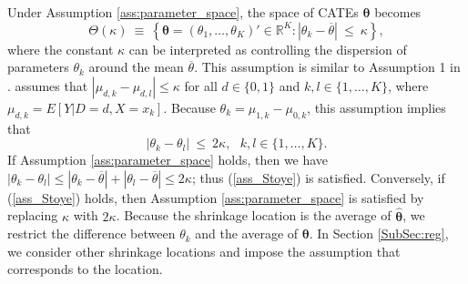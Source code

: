 \documentclass[12pt,a4paper]{article}
\begin{document}
Under Assumption \ref{ass:parameter_space}, the space of CATEs $\bm{\theta}$ becomes
\begin{equation}
\Theta(\kappa) \ \equiv \ \left\{ \bm{\theta} = (\theta_1, \ldots, \theta_K)' \in \mathbb{R}^K : \left| \theta_k - \overline{\theta} \right| \ \leq \ \kappa \right\}, \label{Theta}
\end{equation}
where the constant $\kappa$ can be interpreted as controlling the dispersion of parameters $\theta_{k}$ around the mean $\overline{\theta}$. This assumption is similar to Assumption 1 in \cite{stoye2012minimax}. \cite{stoye2012minimax} assumes that $| \mu_{d,k} - \mu_{d,l} | \leq \kappa$ for all $d \in \{0,1\}$ and $k,l \in \{1, \ldots, K\}$, where $\mu_{d,k} = E[Y|D=d,X=x_k]$. Because $\theta_k = \mu_{1,k} - \mu_{0,k}$, this assumption implies that
\begin{equation}
\left| \theta_k - \theta_l \right| \ \leq \ 2\kappa, \ \ \ k,l \in \{1, \ldots, K\}. \label{ass_Stoye}
\end{equation}
If Assumption \ref{ass:parameter_space} holds, then we have $| \theta_k - \theta_l | \leq | \theta_k - \overline{\theta} | + | \theta_l - \overline{\theta} | \leq 2 \kappa$; thus (\ref{ass_Stoye}) is satisfied. Conversely, if (\ref{ass_Stoye}) holds, then Assumption \ref{ass:parameter_space} is satisfied by replacing $\kappa$ with $2\kappa$. Because the shrinkage location is the average of $\hat{\bm{\theta}}$, we restrict the difference between $\theta_k$ and the average of $\bm{\theta}$. In Section \ref{SubSec:reg}, we consider other shrinkage locations and impose the assumption that corresponds to the location.
\end{document}
